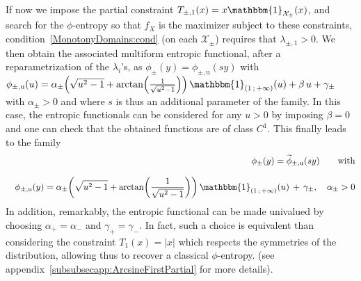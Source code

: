 \documentclass[entropy,article,submit,moreauthors,pdftex]{Definitions/mdpi}
\def\X{\mathcal{X}}%
\def\un{\mathbbm{1}}%
\def\u{\mathrm{u}}
\begin{document}
{\begin{Example}\label{arcsineMulti:ex}
  If now  we impose the  partial constraint $T_{\pm,1}(x) =  x \un_{\X_\pm}(x)$,
  and search  for the $\phi$-entropy so  that $f_X$ is the  maximizer subject to
  these  constraints,  condition~\ref{MonotonyDomains:cond} (on  each  $\X_\pm$)
  requires that $\lambda_{\pm,1} > 0$.   We then obtain the associated multiform
  entropic  functional,  after  a  reparametrization of  the  $\lambda_i$'s,  as
  $\phi_\pm(y) = \phi_{\pm,\u}(s y)$  with $\phi_{\pm,\u}(u) = \alpha_\pm \left(
  \sqrt{u^2 -  1} +  \arctan\left( \frac{1}{\sqrt{u^2 -  1}} \right)  \right) \,
  \un_{( 1 \, ;  \, +\infty )}(u) + \beta \, u +  \gamma_\pm$ with $\alpha_\pm >
  0$ and where $s$ is thus an additional parameter of the family.  In this case,
  the entropic functionals can be considered for  any $u > 0$ by imposing $\beta
  = 0$
  and one can check that the obtained functions are of class $C^1$. This finally
  leads to the family
  \begin{eqnarray*}
  && \phi_\pm(y) =  \widetilde{\phi}_{\pm,\u}(s y) \qquad \mbox{with}
  \\[2.5mm]
   && \phi_{\pm,\u}(y) = \alpha_\pm  \left( \sqrt{u^2 -
   1} + \arctan\left( \frac{1}{\sqrt{u^2 - 1}} \right)  \right)
  \, \un_{(  1 \, ;  \, +\infty )}(u) \, + \, \gamma_\pm, \quad \alpha_\pm > 0
   \end{eqnarray*}
  In  addition, remarkably,  the entropic  functional can  be made  univalued by
  choosing $\alpha_+ = \alpha_-$ and $\gamma_+ = \gamma_-$.
  In fact, such  a choice is equivalent than considering
  the  constraint  $T_1(x)   =  |x|$  which  respects  the   symmetries  of  the
  distribution,  allowing  thus to  recover  a  classical $\phi$-entropy.   (see
  appendix~\ref{subsubsecapp:ArcsineFirstPartial} for more details).
\end{Example}

}
\end{document}
